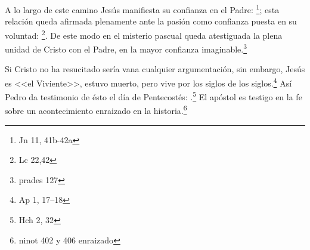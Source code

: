 
A lo largo de este camino Jesús manifiesta su confianza en el Padre:
\footnote{Jn 11, 41b-42a}; esta relación queda afirmada
plenamente ante la pasión como confianza puesta en su voluntad:
\footnote{Lc 22,42}. De este modo en el misterio pascual queda
atestiguada la plena unidad de Cristo con el Padre, en la mayor confianza
imaginable.\footnote{prades 127}



Si Cristo no ha resucitado
sería vana cualquier argumentación, sin embargo, Jesús es <<el Viviente>>,
estuvo muerto, pero vive por los siglos de los siglos.\footnote{Ap 1, 17--18}
Así Pedro da testimonio de ésto el día de Pentecostés: .\footnote{Hch 2, 32} El apóstol es testigo en la fe sobre un
acontecimiento enraizado en la historia.\footnote{ninot 402 y 406 enraizado}

